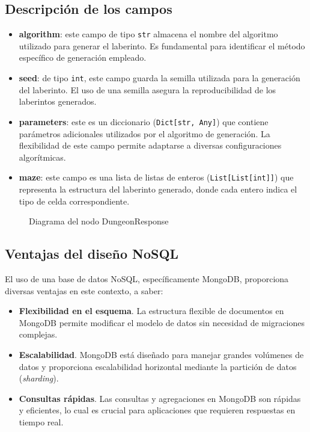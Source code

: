 \subsection{Descripción de los campos}

\begin{itemize}
    \item \textbf{algorithm}: este campo de tipo \texttt{str} almacena el nombre del algoritmo utilizado para generar el laberinto. Es fundamental para identificar el método específico de generación empleado.
    \item \textbf{seed}: de tipo \texttt{int}, este campo guarda la semilla utilizada para la generación del laberinto. El uso de una semilla asegura la reproducibilidad de los laberintos generados.
    \item \textbf{parameters}: este es un diccionario (\texttt{Dict[str, Any]}) que contiene parámetros adicionales utilizados por el algoritmo de generación. La flexibilidad de este campo permite adaptarse a diversas configuraciones algorítmicas.
    \item \textbf{maze}: este campo es una lista de listas de enteros (\texttt{List[List[int]]}) que representa la estructura del laberinto generado, donde cada entero indica el tipo de celda correspondiente.
\end{itemize}


 \begin{figure}[h!]
 \centering
 \caption{Diagrama del nodo DungeonResponse}
 \end{figure}


\subsection{Ventajas del diseño NoSQL}

El uso de una base de datos NoSQL, específicamente MongoDB, proporciona diversas ventajas en este contexto, a saber:

\begin{itemize}
    \item \textbf{Flexibilidad en el esquema}. La estructura flexible de documentos en MongoDB permite modificar el modelo de datos sin necesidad de migraciones complejas.
    \item \textbf{Escalabilidad}. MongoDB está diseñado para manejar grandes volúmenes de datos y proporciona escalabilidad horizontal mediante la partición de datos (\textit{sharding}).
    \item \textbf{Consultas rápidas}. Las consultas y agregaciones en MongoDB son rápidas y eficientes, lo cual es crucial para aplicaciones que requieren respuestas en tiempo real.
\end{itemize}


